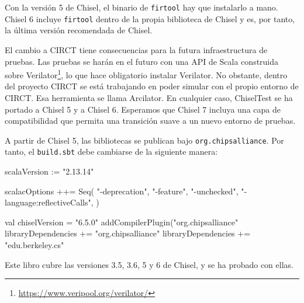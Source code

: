 \documentclass[%
    10pt,
    headinclude, footinclude=false,
    openright, %
    notitlepage,
    cleardoublepage=empty,
    headsepline,
    numbers=noenddot,
    bibliography=totoc, index=totoc,
    ]{scrbook}
\newcommand{\code}[1]{{\lstinline[basicstyle=\small\ttfamily]{#1}}}
\newcommand{\myref}[2]{\href{#1}{#2}}
\renewcommand{\myref}[2]{{#2}{\footnote{\url{#1}}}}
\begin{document}
Con la versión 5 de Chisel, el binario de \code{firtool} hay que instalarlo a mano.
Chisel 6 incluye \code{firtool} dentro de la propia biblioteca de Chisel y es, por tanto, la última
versión recomendada de Chisel.


El cambio a CIRCT tiene consecuencias para la futura infraestructura de pruebas.
Las pruebas se harán en el futuro con una API de Scala construida sobre
\myref{https://www.veripool.org/verilator/}{Verilator}, lo que hace obligatorio instalar
Verilator. No obstante, dentro del proyecto CIRCT se está trabajando en poder simular con el propio
entorno de CIRCT. Esa herramienta se llama Arcilator.
En cualquier caso, ChiselTest se ha portado a Chisel 5 y a Chisel 6.
Esperamos que Chisel 7 incluya una capa de compatibilidad que permita una transición suave a un nuevo
entorno de pruebas.


A partir de Chisel 5, las bibliotecas se publican bajo \code{org.chipsalliance}.
Por tanto, el \code{build.sbt} debe cambiarse de la siguiente manera:

\begin{chisel}
scalaVersion := "2.13.14"

scalacOptions ++= Seq(
  "-deprecation",
  "-feature",
  "-unchecked",
  "-language:reflectiveCalls",
)

val chiselVersion = "6.5.0"
addCompilerPlugin("org.chipsalliance" %
libraryDependencies += "org.chipsalliance" %
libraryDependencies += "edu.berkeley.cs" %
\end{chisel}


Este libro cubre las versiones 3.5, 3.6, 5 y 6 de Chisel, y se ha probado con ellas.
\end{document}
